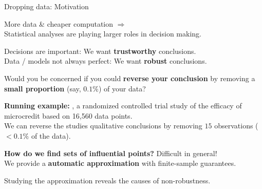 \begin{frame}{Dropping data: Motivation}

More data \& cheaper computation $\Rightarrow$\\
Statistical analyses are
playing larger roles in decision making.

\vspace{1em}
Decisions are important: We want \textbf{trustworthy} conclusions.\\
Data / models not always perfect: We want \textbf{robust} conclusions.


\vspace{1em}
Would you be concerned if you could \textbf{reverse your conclusion} by removing
a \textbf{small proportion} (say, $0.1\%$) of your data?

\vspace{1em}
\textbf{Running example:} \citet{angelucci2015microcredit}, a
randomized controlled trial study of the efficacy of microcredit based
on 16,560 data points.  \\We can reverse the studies qualitative
conclusions by removing $15$ observations ($< 0.1 \%$ of the data).

\vspace{1em}
\textbf{How do we find sets of influential points?}  Difficult in general!\\

\vspace{1em}
We provide a \textbf{automatic approximation} with finite-sample
guarantees.

\vspace{1em}
Studying the approximation reveals the causes of non-robustness.

\end{frame}



